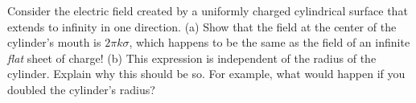 Consider the electric field created by a uniformly
        charged cylindrical surface that extends to infinity in one direction.\hwendpart
        (a) Show that the
        field at the center of the cylinder's mouth is $2\pi k\sigma$, 
        which happens to be the same as the field of an infinite \emph{flat}
        sheet of charge!\hwendpart
        (b) This expression is independent of the radius of the
        cylinder. Explain why this should be so. For example, what
        would happen if you doubled the cylinder's radius?

